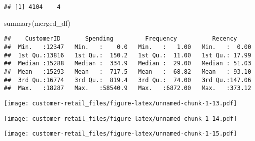 \documentclass[
]{article}
\newenvironment{Shaded}{\begin{snugshade}}{\end{snugshade}}
\newcommand{\AttributeTok}[1]{\textcolor[rgb]{0.77,0.63,0.00}{#1}}
\newcommand{\CommentTok}[1]{\textcolor[rgb]{0.56,0.35,0.01}{\textit{#1}}}
\newcommand{\FunctionTok}[1]{\textcolor[rgb]{0.00,0.00,0.00}{#1}}
\newcommand{\NormalTok}[1]{#1}
\newcommand{\SpecialCharTok}[1]{\textcolor[rgb]{0.00,0.00,0.00}{#1}}
\begin{document}
\begin{verbatim}
## [1] 4104    4
\end{verbatim}

\begin{Shaded}
\begin{Highlighting}[]
\FunctionTok{summary}\NormalTok{(merged\_df)}
\end{Highlighting}
\end{Shaded}

\begin{verbatim}
##    CustomerID       Spending         Frequency          Recency      
##  Min.   :12347   Min.   :    0.0   Min.   :   1.00   Min.   :  0.00  
##  1st Qu.:13816   1st Qu.:  150.2   1st Qu.:  11.00   1st Qu.: 17.99  
##  Median :15288   Median :  334.9   Median :  29.00   Median : 51.03  
##  Mean   :15293   Mean   :  717.5   Mean   :  68.82   Mean   : 93.10  
##  3rd Qu.:16774   3rd Qu.:  819.4   3rd Qu.:  74.00   3rd Qu.:147.06  
##  Max.   :18287   Max.   :58540.9   Max.   :6872.00   Max.   :373.12
\end{verbatim}

\begin{Shaded}
\end{Shaded}

\texttt{[image: customer-retail\_files/figure-latex/unnamed-chunk-1-13.pdf]}

\begin{Shaded}
\end{Shaded}

\texttt{[image: customer-retail\_files/figure-latex/unnamed-chunk-1-14.pdf]}

\begin{Shaded}
\end{Shaded}

\texttt{[image: customer-retail\_files/figure-latex/unnamed-chunk-1-15.pdf]}
\end{document}
